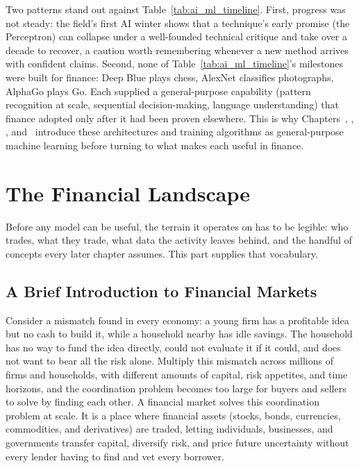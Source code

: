 \documentclass[../ai_in_finance]{subfiles}
\begin{document}
Two patterns stand out against Table~\ref{tab:ai_ml_timeline}. First, progress was not steady: the field's first AI winter shows that a technique's early promise (the Perceptron) can collapse under a well-founded technical critique and take over a decade to recover, a caution worth remembering whenever a new method arrives with confident claims.
Second, none of Table~\ref{tab:ai_ml_timeline}'s milestones were built for finance: Deep Blue plays chess, AlexNet classifies photographs, AlphaGo plays Go. Each supplied a general-purpose capability (pattern recognition at scale, sequential decision-making, language understanding) that finance adopted only after it had been proven elsewhere. This is why Chapters~, , , and~ introduce these architectures and training algorithms as general-purpose machine learning before turning to what makes each useful in finance.

\section{The Financial Landscape}

Before any model can be useful, the terrain it operates on has to be legible: who trades, what they trade, what data the activity leaves behind, and the handful of concepts every later chapter assumes. This part supplies that vocabulary.

\subsection{A Brief Introduction to Financial Markets}

Consider a mismatch found in every economy: a young firm has a profitable idea but no cash to build it, while a household nearby has idle savings. The household has no way to fund the idea directly, could not evaluate it if it could, and does not want to bear all the risk alone. Multiply this mismatch across millions of firms and households, with different amounts of capital, risk appetites, and time horizons, and the coordination problem becomes too large for buyers and sellers to solve by finding each other.
A financial market solves this coordination problem at scale. It is a place where financial assets (stocks, bonds, currencies, commodities, and derivatives) are traded, letting individuals, businesses, and governments transfer capital, diversify risk, and price future uncertainty without every lender having to find and vet every borrower.
\end{document}
